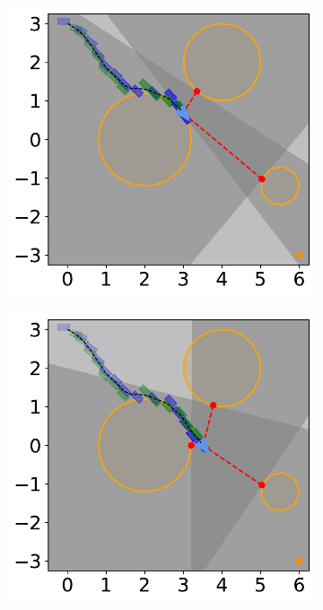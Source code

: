 \begin{figure}[H]
    \begin{subfigure}{0.35\textwidth}
        \centering
        \includegraphics[width=\textwidth]{figures/Simulations/sim1circles/frame_4.pdf}
    \end{subfigure}
    \hfil
    \begin{subfigure}{0.35\textwidth}
        \centering
        \includegraphics[width=\textwidth]{figures/Simulations/sim1circles/frame_5.pdf}
    \end{subfigure}%


\end{figure}
